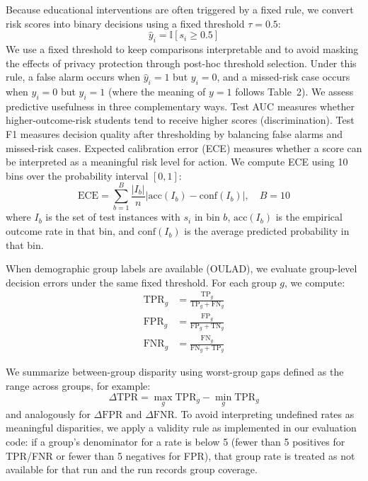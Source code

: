 \documentclass{edm_article}
\begin{document}
Because educational interventions are often triggered by a fixed rule, we convert risk scores into binary decisions using a fixed threshold $\tau = 0.5$:
\begin{equation}
\hat{y}_i = \mathbb{I}[s_i \ge 0.5]
\end{equation}
We use a fixed threshold to keep comparisons interpretable and to avoid masking the effects of privacy protection through post-hoc threshold selection. Under this rule, a false alarm occurs when $\hat{y}_i{=}1$ but $y_i{=}0$, and a missed-risk case occurs when $\hat{y}_i{=}0$ but $y_i{=}1$ (where the meaning of $y{=}1$ follows Table~2). We assess predictive usefulness in three complementary ways. Test AUC measures whether higher-outcome-risk students tend to receive higher scores (discrimination). Test F1 measures decision quality after thresholding by balancing false alarms and missed-risk cases. Expected calibration error (ECE) measures whether a score can be interpreted as a meaningful risk level for action. We compute ECE using 10 bins over the probability interval $[0,1]$:
\begin{equation}
\mathrm{ECE} = \sum_{b=1}^{B} \frac{|I_b|}{n}\left|\mathrm{acc}(I_b) - \mathrm{conf}(I_b)\right|,\quad B=10
\end{equation}
where $I_b$ is the set of test instances with $s_i$ in bin $b$, $\mathrm{acc}(I_b)$ is the empirical outcome rate in that bin, and $\mathrm{conf}(I_b)$ is the average predicted probability in that bin.

When demographic group labels are available (OULAD), we evaluate group-level decision errors under the same fixed threshold. For each group $g$, we compute:
\begin{align}
\mathrm{TPR}_g &= \frac{\mathrm{TP}_g}{\mathrm{TP}_g + \mathrm{FN}_g} \\
\mathrm{FPR}_g &= \frac{\mathrm{FP}_g}{\mathrm{FP}_g + \mathrm{TN}_g} \\
\mathrm{FNR}_g &= \frac{\mathrm{FN}_g}{\mathrm{FN}_g + \mathrm{TP}_g}
\end{align}

We summarize between-group disparity using worst-group gaps defined as the range across groups, for example:
\begin{equation}
\Delta\mathrm{TPR} = \max_g \mathrm{TPR}_g - \min_g \mathrm{TPR}_g
\end{equation}
and analogously for $\Delta\mathrm{FPR}$ and $\Delta\mathrm{FNR}$. To avoid interpreting undefined rates as meaningful disparities, we apply a validity rule as implemented in our evaluation code: if a group's denominator for a rate is below 5 (fewer than 5 positives for TPR/FNR or fewer than 5 negatives for FPR), that group rate is treated as not available for that run and the run records group coverage.
\end{document}
